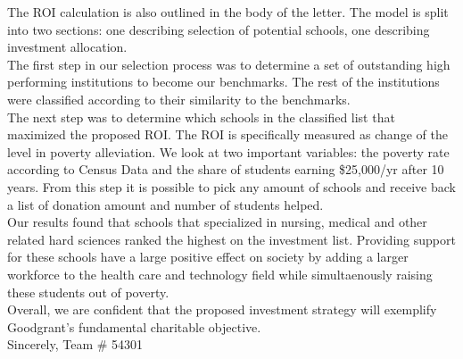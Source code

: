 \documentclass[12pt]{scrartcl}
\begin{document}
The ROI calculation is also outlined in the body of the letter. The model is split into two sections: one describing selection of potential schools, one describing investment allocation. \\

The first step in our selection process was to determine a set of outstanding high performing institutions to become our benchmarks. The rest of the institutions were classified according to their similarity to the benchmarks. \\

The next step was to determine which schools in the classified list that maximized the proposed ROI. The ROI is specifically measured as change of the level in poverty alleviation. We look at two important variables: the poverty rate according to Census Data and the share of students earning \$25,000/yr after 10 years. From this step it is possible to pick any amount of schools and receive back a list of donation amount and number of students helped. \\

Our results found that schools that specialized in nursing, medical and other related hard sciences ranked the highest on the investment list. Providing support for these schools have a large positive effect on society by adding a larger workforce to the health care and technology field while simultaenously raising these students out of poverty. \\

Overall, we are confident that the proposed investment strategy will exemplify Goodgrant’s fundamental charitable objective. \\

Sincerely,
Team \# 54301
\newpage
\end{document}

